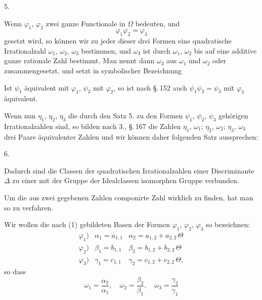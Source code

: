 
5. 

Wenn $\varphi_1$, $\varphi_2$ zwei ganze Functionale in $\Omega$ bedeuten, und
\[
\varphi_1 \varphi_2 = \varphi_3
\]
gesetzt wird, so k\"onnen wir zu jeder dieser drei Formen eine quadratische Irrationalzahl $\omega_1$, $\omega_2$, $\omega_3$ bestimmen, und $\omega_3$ ist durch $\omega_1$, $\omega_2$ bis auf eine additive ganze rationale Zahl bestimmt. Man nennt dann $\omega_3$ aus $\omega_1$ und $\omega_2$  oder zusammengesetzt, und setzt in symbolischer Bezeichnung

Ist $\psi_1$ \"aquivalent mit $\varphi_1$, $\psi_2$ mit $\varphi_2$, so ist nach \S.\,152 auch $\psi_1 \psi_2 = \psi_3$ mit $\varphi_3$ \"aquivalent.

Wenn nun $\eta_1$, $\eta_2$, $\eta_3$ die durch den Satz 5. zu den Formen $\psi_1$, $\psi_2$, $\psi_3$ geh\"origen Irrationalzahlen sind, so bilden nach 3., \S.\,167 die Zahlen $\eta_1$, $\omega_1$; $\eta_2$, $\omega_2$; $\eta_3$, $\omega_3$ drei Paare \"aquivalenter Zahlen und wir k\"onnen daher folgenden Satz aussprechen:

6. 

Dadurch sind die Classen der quadratischen Irrationalzahlen einer Discriminante $\Delta$ zu einer mit der Gruppe der Idealclassen isomorphen  Gruppe verbunden.

Um die aus zwei gegebenen Zahlen componirte Zahl wirklich zu finden, hat man so zu verfahren.

Wir wollen die nach (1) gebildeten Basen der Formen $\varphi_1$, $\varphi_2$, $\varphi_3$ so bezeichnen:
\[
\begin{array}{lll}
\varphi_1) & \alpha_1 = a_{1,1} & \alpha_2 = a_{1,2} + a_{2,2}\,\Theta \\
\varphi_2) & \beta_1 = b_{1,1} & \beta_2 = b_{1,2} + b_{2,2}\,\Theta \\
\varphi_3) & \gamma_1 = c_{1,1} & \gamma_2 = c_{1,2} + c_{2,2}\,\Theta,
\end{array}
\]
so dass
\[
\omega_1 = \frac{\alpha_2}{\alpha_1}, \quad \omega_2 = \frac{\beta_2}{\beta_1}, \quad \omega_3 = \frac{\gamma_2}{\gamma_1}
\]
